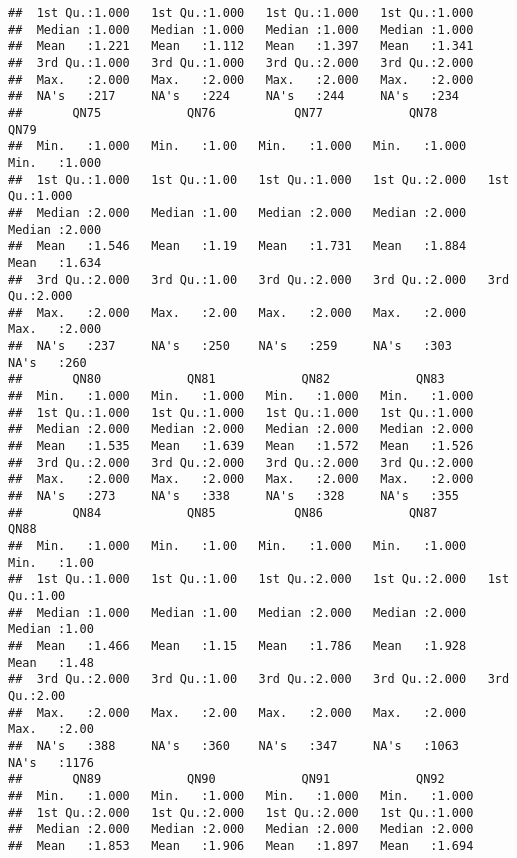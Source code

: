 \documentclass[
]{article}
\begin{document}
\begin{verbatim}
##  1st Qu.:1.000   1st Qu.:1.000   1st Qu.:1.000   1st Qu.:1.000  
##  Median :1.000   Median :1.000   Median :1.000   Median :1.000  
##  Mean   :1.221   Mean   :1.112   Mean   :1.397   Mean   :1.341  
##  3rd Qu.:1.000   3rd Qu.:1.000   3rd Qu.:2.000   3rd Qu.:2.000  
##  Max.   :2.000   Max.   :2.000   Max.   :2.000   Max.   :2.000  
##  NA's   :217     NA's   :224     NA's   :244     NA's   :234    
##       QN75            QN76           QN77            QN78            QN79      
##  Min.   :1.000   Min.   :1.00   Min.   :1.000   Min.   :1.000   Min.   :1.000  
##  1st Qu.:1.000   1st Qu.:1.00   1st Qu.:1.000   1st Qu.:2.000   1st Qu.:1.000  
##  Median :2.000   Median :1.00   Median :2.000   Median :2.000   Median :2.000  
##  Mean   :1.546   Mean   :1.19   Mean   :1.731   Mean   :1.884   Mean   :1.634  
##  3rd Qu.:2.000   3rd Qu.:1.00   3rd Qu.:2.000   3rd Qu.:2.000   3rd Qu.:2.000  
##  Max.   :2.000   Max.   :2.00   Max.   :2.000   Max.   :2.000   Max.   :2.000  
##  NA's   :237     NA's   :250    NA's   :259     NA's   :303     NA's   :260    
##       QN80            QN81            QN82            QN83      
##  Min.   :1.000   Min.   :1.000   Min.   :1.000   Min.   :1.000  
##  1st Qu.:1.000   1st Qu.:1.000   1st Qu.:1.000   1st Qu.:1.000  
##  Median :2.000   Median :2.000   Median :2.000   Median :2.000  
##  Mean   :1.535   Mean   :1.639   Mean   :1.572   Mean   :1.526  
##  3rd Qu.:2.000   3rd Qu.:2.000   3rd Qu.:2.000   3rd Qu.:2.000  
##  Max.   :2.000   Max.   :2.000   Max.   :2.000   Max.   :2.000  
##  NA's   :273     NA's   :338     NA's   :328     NA's   :355    
##       QN84            QN85           QN86            QN87            QN88     
##  Min.   :1.000   Min.   :1.00   Min.   :1.000   Min.   :1.000   Min.   :1.00  
##  1st Qu.:1.000   1st Qu.:1.00   1st Qu.:2.000   1st Qu.:2.000   1st Qu.:1.00  
##  Median :1.000   Median :1.00   Median :2.000   Median :2.000   Median :1.00  
##  Mean   :1.466   Mean   :1.15   Mean   :1.786   Mean   :1.928   Mean   :1.48  
##  3rd Qu.:2.000   3rd Qu.:1.00   3rd Qu.:2.000   3rd Qu.:2.000   3rd Qu.:2.00  
##  Max.   :2.000   Max.   :2.00   Max.   :2.000   Max.   :2.000   Max.   :2.00  
##  NA's   :388     NA's   :360    NA's   :347     NA's   :1063    NA's   :1176  
##       QN89            QN90            QN91            QN92      
##  Min.   :1.000   Min.   :1.000   Min.   :1.000   Min.   :1.000  
##  1st Qu.:2.000   1st Qu.:2.000   1st Qu.:2.000   1st Qu.:1.000  
##  Median :2.000   Median :2.000   Median :2.000   Median :2.000  
##  Mean   :1.853   Mean   :1.906   Mean   :1.897   Mean   :1.694  

\end{verbatim}
\end{document}
